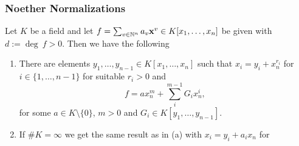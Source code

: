 \subsubsection{Noether Normalizations}
    \begin{lemma}\label{MainTechnicalLemmaForNNT}
        Let $K$ be a field and let $f=\sum_{v\in \mathbb{N}^n} a_v\mathbf{x}^v\in K[x_1,\dots,x_n]$ be given with $d :=\deg \ f >0$. Then we have the following
        \begin{enumerate}
            \item There are elements $y_1,\dots,y_{n-1}\in K[x_1,\dots,x_n]$  such that $x_i = y_i + x_n^{r_i}$ for $i\in\{1,\dots,n-1\}$ for suitable $r_i>0$ and
            $$f= ax_n^m +\sum_i^{m-1} G_ix_n^i,$$
            for some $a\in K\setminus \{0\}$, $m>0$ and $G_i\in  K[y_1,\dots,y_{n-1}]$.
            \item If $\# K =\infty$ we get the same result as in (a) with $x_i = y_i+a_ix_n$ for
        \end{enumerate}
    \end{lemma}
